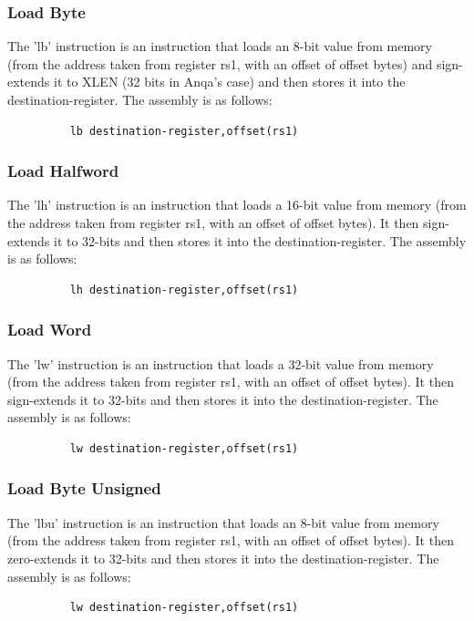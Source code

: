 \documentclass{article}
\begin{document}
\subsubsection{Load Byte}
\qquad
The 'lb' instruction is an instruction that loads an 8-bit value from memory (from the address taken from register rs1, with an offset of offset bytes) and sign-extends it to XLEN (32 bits in Anqa's case) and then stores it into the destination-register. The assembly is as follows:
\begin{figure}[!htbp]
    \centering
    \begin{verbatim}
    lb destination-register,offset(rs1)
    \end{verbatim}
\end{figure}\newline

\subsubsection{Load Halfword}
\qquad
The 'lh' instruction is an instruction that loads a 16-bit value from memory (from the address taken from register rs1, with an offset of offset bytes). It then sign-extends it to 32-bits and then stores it into the destination-register. The assembly is as follows:
\begin{figure}[!htbp]
    \centering
    \begin{verbatim}
    lh destination-register,offset(rs1)
    \end{verbatim}
\end{figure}\newline

\subsubsection{Load Word}
\qquad
The 'lw' instruction is an instruction that loads a 32-bit value from memory (from the address taken from register rs1, with an offset of offset bytes). It then sign-extends it to 32-bits and then stores it into the destination-register. The assembly is as follows:
\begin{figure}[!htbp]
    \centering
    \begin{verbatim}
    lw destination-register,offset(rs1)
    \end{verbatim}
\end{figure}\newline

\subsubsection{Load Byte Unsigned}
\qquad
The 'lbu' instruction is an instruction that loads an 8-bit value from memory (from the address taken from register rs1, with an offset of offset bytes). It then zero-extends it to 32-bits and then stores it into the destination-register. The assembly is as follows:
\begin{figure}[!htbp]
    \centering
    \begin{verbatim}
    lw destination-register,offset(rs1)
    \end{verbatim}
\end{figure}\newline
\end{document}
